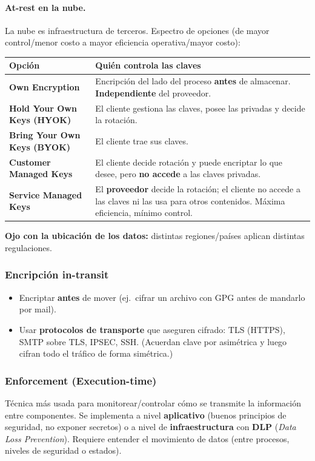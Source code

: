\documentclass[../main.tex]{subfiles}
\begin{document}
\paragraph{At-rest en la nube.} La nube es infraestructura de terceros. Espectro de
opciones (de mayor control/menor costo a mayor eficiencia operativa/mayor costo):
\begin{center}
\begin{tabular}{@{}>{\bfseries}l p{10.5cm}@{}}
\toprule
Opción & Quién controla las claves \\
\midrule
Own Encryption & Encripción del lado del proceso \textbf{antes} de almacenar.
  \textbf{Independiente} del proveedor. \\
Hold Your Own Keys (HYOK) & El cliente gestiona las claves, posee las privadas y decide
  la rotación. \\
Bring Your Own Keys (BYOK) & El cliente trae sus claves. \\
Customer Managed Keys & El cliente decide rotación y puede encriptar lo que desee, pero
  \textbf{no accede} a las claves privadas. \\
Service Managed Keys & El \textbf{proveedor} decide la rotación; el cliente no accede a
  las claves ni las usa para otros contenidos. Máxima eficiencia, mínimo control. \\
\bottomrule
\end{tabular}
\end{center}
\textbf{Ojo con la ubicación de los datos:} distintas regiones/países aplican distintas
regulaciones.

\subsubsection{Encripción in-transit}
\begin{itemize}[nosep]
  \item Encriptar \textbf{antes} de mover (ej.\ cifrar un archivo con GPG antes de
        mandarlo por mail).
  \item Usar \textbf{protocolos de transporte} que aseguren cifrado: TLS (HTTPS),
        SMTP sobre TLS, IPSEC, SSH. (Acuerdan clave por asimétrica y luego cifran todo
        el tráfico de forma simétrica.)
\end{itemize}

\subsubsection{Enforcement (Execution-time)}
Técnica más usada para monitorear/controlar cómo se transmite la información entre
componentes. Se implementa a nivel \textbf{aplicativo} (buenos principios de seguridad,
no exponer secretos) o a nivel de \textbf{infraestructura} con \textbf{DLP} (\emph{Data
Loss Prevention}). Requiere entender el movimiento de datos (entre procesos, niveles de
seguridad o estados).
\end{document}

